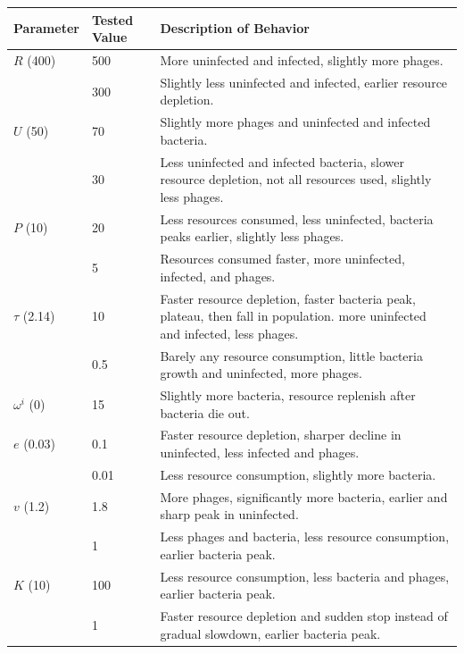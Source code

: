 \begin{table}
    \small 
    \centering
    \begin{tabularx}{\textwidth}{l l X}
        \toprule
        \textbf{Parameter} & \textbf{Tested Value} & \textbf{Description of Behavior} \\
        \midrule
        $R$ (400) & 500 & More uninfected and infected, slightly more phages.\\
         & 300 & Slightly less uninfected and infected, earlier resource depletion.\\

        \midrule
        $U$ (50) & 70 & Slightly more phages and uninfected and infected bacteria.\\
         & 30 & Less uninfected and infected bacteria, slower resource depletion, not all resources used, slightly less phages. \\

        \midrule
        $P$ (10) & 20 & Less resources consumed, less uninfected, bacteria peaks earlier, slightly less phages.\\
         & 5 & Resources consumed faster, more uninfected, infected, and phages.\\

        \midrule
        $\tau$ (2.14) & 10 & Faster resource depletion, faster bacteria peak, plateau, then fall in population. more uninfected and infected, less phages.\\
         & 0.5& Barely any resource consumption, little bacteria growth and uninfected, more phages.\\

        \midrule
        $\omega^i$ (0) & 15 & Slightly more bacteria, resource replenish after bacteria die out.\\

        \midrule
        $e$ (0.03) & 0.1 & Faster resource depletion, sharper decline in uninfected, less infected and phages. \\
         & 0.01 & Less resource consumption, slightly more bacteria.\\

        \midrule
        $v$ (1.2) & 1.8 & More phages, significantly more bacteria, earlier and sharp peak in uninfected. \\
         & 1 & Less phages and bacteria, less resource consumption, earlier bacteria peak.\\

        \midrule
        $K$ (10) & 100 & Less resource consumption, less bacteria and phages, earlier bacteria peak.\\
         & 1 & Faster resource depletion and sudden stop instead of gradual slowdown, earlier bacteria peak.\\


\end{tabularx}
\end{table}
